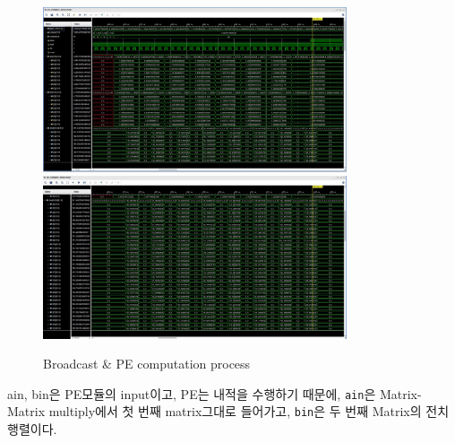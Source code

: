 \documentclass{article}
\begin{document}
\begin{figure}[htb!]
	\centering
	\includegraphics[width=0.8\textwidth]{fig/mm1.jpg}
	\includegraphics[width=0.8\textwidth]{fig/mm2.jpg}
\caption{Broadcast \& PE computation process}
\label{testbench}
\end{figure}
ain, bin은 PE모듈의 input이고, PE는 내적을 수행하기 때문에, \texttt{ain}은 Matrix-Matrix multiply에서 첫 번째 matrix그대로 들어가고, \texttt{bin}은 두 번째 Matrix의 전치행렬이다.
\end{document}
